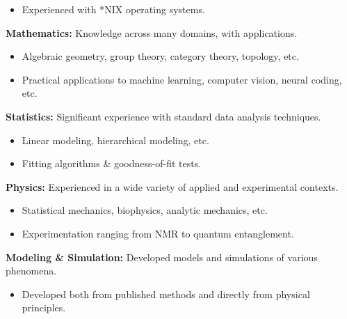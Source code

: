 \documentclass[margin]{res}
\begin{document}
\begin{resume}
\begin{itemize}
  \item Experienced with *NIX operating systems.
\end{itemize}\vspace{-8pt}
{\bf Mathematics:} Knowledge across many domains, with applications.
\begin{itemize} \itemsep -2pt
\item Algebraic geometry, group theory, category theory, topology, etc. \item Practical applications to machine learning, computer vision, neural coding, etc. \end{itemize}\vspace{-8pt}
{\bf Statistics:} Significant experience with standard data analysis techniques.
\begin{itemize} \itemsep -2pt
  \item Linear modeling, hierarchical modeling, etc.
  \item Fitting algorithms \& goodness-of-fit tests. \end{itemize} \vspace{-8pt}
{\bf Physics:} Experienced in a wide variety of applied and experimental contexts.\begin{itemize} \itemsep -2pt
\item Statistical mechanics, biophysics, analytic mechanics, etc. \item Experimentation ranging from NMR to quantum entanglement. \end{itemize}\vspace{-8pt}
{\bf Modeling \& Simulation:} Developed models and simulations of various phenomena. 
\begin{itemize} \itemsep -2pt
  \item Developed both from published methods and directly from physical principles. \end{itemize}

\end{resume}
\end{document}
